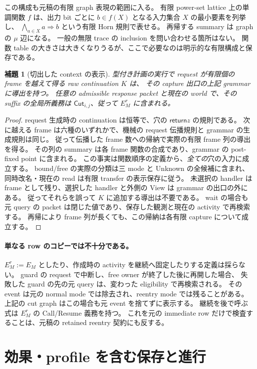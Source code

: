 \documentclass[11pt,a4paper]{article}
\newtheorem{lemma}[definition]{補題}
\newcommand{\Ret}{\mathsf{return}}
\begin{document}
この構成も元稿の有限 graph 表現の範囲に入る。
有限 power-set lattice 上の単調関数 \(f\) は、出力 bit ごとに
\(b\in f(X)\) となる入力集合 \(X\) の最小要素を列挙し、
\(\bigwedge_{a\in X}a\Rightarrow b\) という有限 Horn 規則で表せる。
再帰する summary は graph の \(\mu\) 辺になる。
一般の無限 trace の inclusion を問い合わせる箇所はない。
関数 table の大きさは大きくなりうるが、ここで必要なのは明示的な有限構成と保存である。

\begin{lemma}[切出した context の表示]
型付き計画の実行で request が有限個の frame を越えて得る raw continuation \(K\) は、
その capture 出口の上記 grammar に導出を持つ。
任意の admissible response packet と現在の world で、その suffix の全局所義務は
\(\mathsf{Cut}_{i,j}\)、従って \(E_M^r\) に含まれる。
\end{lemma}
\begin{proof}
request 生成時の continuation は恒等で、穴の \(\Ret z\) の規則である。
次に越える frame は六種のいずれかで、機械の request 伝播規則と grammar の生成規則は同じ。
従って伝播した frame 数への帰納で実際の有限 frame 列の導出を得る。
その列の summary は各 frame 関数の合成であり、grammar の post-fixed point に含まれる。
この事実は関数順序の定義から、\emph{全ての}穴の入力に成立する。
bound/free の実際の分類は三 mode と Unknown の全候補に含まれ、
同時改名・現在の read は有限 transfer の表示保存に従う。
未選択の handler は frame として残り、選択した handler と外側の View は grammar の出口の外にある。
従ってそれらを誤って \(K\) に追加する導出は不要である。
wait の場合も元 query の packet は閉じた値であり、保存した観測と現在の activity で再検索する。
再帰により frame 列が長くても、この帰納は各有限 capture について成立する。
\end{proof}

\paragraph{単なる row のコピーでは不十分である。}
\(E_M^r:=E_M\) としたり、作成時の activity を継続へ固定したりする定義は採らない。
guard の request で中断し、free owner が終了した後に再開した場合、
失敗した guard の先の元 query は、変わった eligibility で再検索される。
その event は元の normal mode では除去され、reentry mode では残ることがある。
上記の cut graph はこの場合も元 event を捨てずに表示する。
継続を後で呼ぶ式は \(E_M^r\) の Call/Resume 義務を持つ。
これを元の immediate row だけで検査することは、元稿の retained reentry 契約にも反する。

\section{効果・profile を含む保存と進行}
\label{sec:full-proof}
\end{document}
